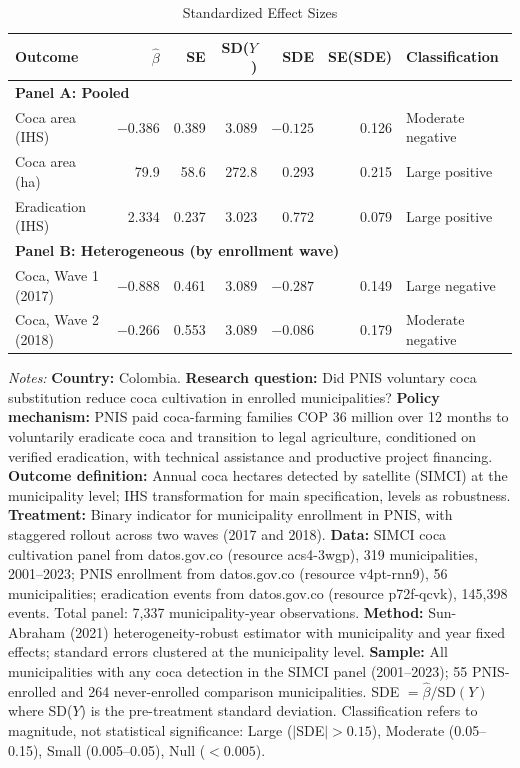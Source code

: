 \begin{table}[htbp]
\centering
\caption{Standardized Effect Sizes}
\label{tab:sde}
\begin{tabular}{lrrrrrl}
\toprule
Outcome & $\hat{\beta}$ & SE & SD($Y$) & SDE & SE(SDE) & Classification \\
\midrule
\multicolumn{7}{l}{\textbf{Panel A: Pooled}} \\
Coca area (IHS) & $-0.386$ & 0.389 & 3.089 & $-0.125$ & 0.126 & Moderate negative \\
Coca area (ha) & 79.9 & 58.6 & 272.8 & 0.293 & 0.215 & Large positive \\
Eradication (IHS) & 2.334 & 0.237 & 3.023 & 0.772 & 0.079 & Large positive \\
\midrule
\multicolumn{7}{l}{\textbf{Panel B: Heterogeneous (by enrollment wave)}} \\
Coca, Wave 1 (2017) & $-0.888$ & 0.461 & 3.089 & $-0.287$ & 0.149 & Large negative \\
Coca, Wave 2 (2018) & $-0.266$ & 0.553 & 3.089 & $-0.086$ & 0.179 & Moderate negative \\
\bottomrule
\end{tabular}
\begin{tablenotes}[flushleft]\small
\item \textit{Notes:} \textbf{Country:} Colombia. \textbf{Research question:} Did PNIS voluntary coca substitution reduce coca cultivation in enrolled municipalities? \textbf{Policy mechanism:} PNIS paid coca-farming families COP 36 million over 12 months to voluntarily eradicate coca and transition to legal agriculture, conditioned on verified eradication, with technical assistance and productive project financing. \textbf{Outcome definition:} Annual coca hectares detected by satellite (SIMCI) at the municipality level; IHS transformation for main specification, levels as robustness. \textbf{Treatment:} Binary indicator for municipality enrollment in PNIS, with staggered rollout across two waves (2017 and 2018). \textbf{Data:} SIMCI coca cultivation panel from datos.gov.co (resource acs4-3wgp), 319 municipalities, 2001--2023; PNIS enrollment from datos.gov.co (resource v4pt-rnn9), 56 municipalities; eradication events from datos.gov.co (resource p72f-qcvk), 145,398 events. Total panel: 7,337 municipality-year observations. \textbf{Method:} Sun-Abraham (2021) heterogeneity-robust estimator with municipality and year fixed effects; standard errors clustered at the municipality level. \textbf{Sample:} All municipalities with any coca detection in the SIMCI panel (2001--2023); 55 PNIS-enrolled and 264 never-enrolled comparison municipalities. SDE $= \hat{\beta} / \text{SD}(Y)$ where SD($Y$) is the pre-treatment standard deviation. Classification refers to magnitude, not statistical significance: Large ($|$SDE$| > 0.15$), Moderate (0.05--0.15), Small (0.005--0.05), Null ($< 0.005$).
\end{tablenotes}
\end{table}

